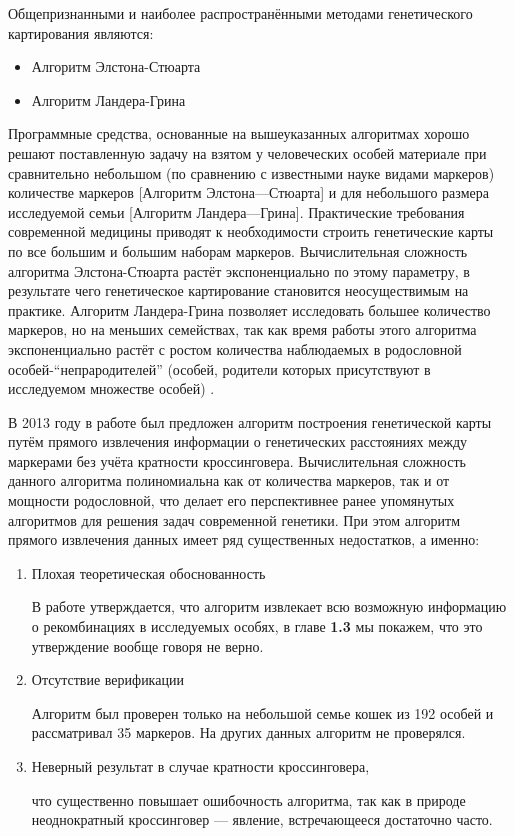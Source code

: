 \documentclass{matmex-diploma-custom}
\begin{document}
Общепризнанными \cite{kruglyak1996parametric} и наиболее
распространёнными методами генетического картирования являются:
\begin{itemize}
\item Алгоритм Элстона-Стюарта
\item Алгоритм Ландера-Грина
\end{itemize}

Программные средства, основанные на вышеуказанных алгоритмах хорошо
решают поставленную задачу на взятом у человеческих особей материале
при сравнительно небольшом (по сравнению с известными науке видами
маркеров) количестве маркеров [Алгоритм Элстона---Стюарта] и для
небольшого размера исследуемой семьи [Алгоритм
Ландера---Грина]. Практические требования современной медицины
приводят к необходимости строить генетические карты по все большим и
большим наборам маркеров. Вычислительная сложность алгоритма
Элстона-Стюарта растёт \cite{fishelson2002exact} экспоненциально по
этому параметру, в результате чего генетическое картирование
становится неосуществимым на практике. Алгоритм Ландера-Грина
позволяет исследовать большее количество маркеров, но на меньших
семействах, так как время работы этого алгоритма экспоненциально
растёт с ростом количества наблюдаемых в родословной
особей-``непрародителей'' (особей, родители которых присутствуют в
исследуемом множестве особей) \cite{fishelson2002exact}.

В 2013 году в работе \cite{sysoev} был предложен алгоритм построения
генетической карты путём прямого извлечения информации о генетических
расстояниях между маркерами без учёта кратности
кроссинговера. Вычислительная сложность данного алгоритма
полиномиальна как от количества маркеров, так и от мощности
родословной, что делает его перспективнее ранее упомянутых алгоритмов
для решения задач современной генетики. При этом алгоритм прямого
извлечения данных имеет ряд существенных недостатков, а именно:
\begin{enumerate}
\item Плохая теоретическая обоснованность

  В работе \cite{sysoev} утверждается, что алгоритм извлекает всю
  возможную информацию о рекомбинациях в исследуемых особях, в главе
  \textbf{1.3} мы покажем, что это утверждение вообще говоря не верно.

\item Отсутствие верификации

  Алгоритм был проверен только на небольшой семье кошек из 192 особей
  и рассматривал 35 маркеров. На других данных алгоритм не проверялся.

\item Неверный результат в случае кратности кроссинговера,

  что существенно повышает ошибочность алгоритма, так как в природе
  неоднократный кроссинговер --- явление, встречающееся достаточно
  часто.

\end{enumerate}
\end{document}
